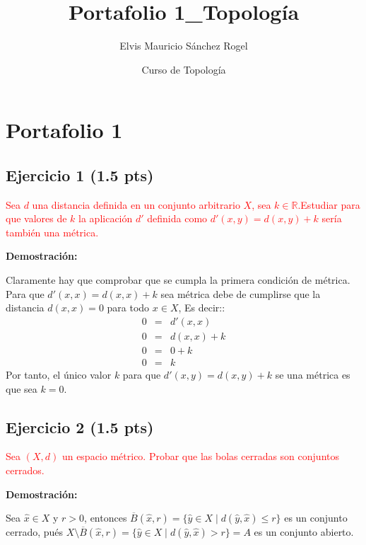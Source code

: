 \documentclass[
]{article}
\title{Portafolio 1\_Topología}
\author{Elvis Mauricio Sánchez Rogel}
\date{Curso de Topología}
\begin{document}
\maketitle

{
\hypersetup{linkcolor=blue}
\setcounter{tocdepth}{2}
\tableofcontents
}
\hypertarget{portafolio-1}{%
\section{Portafolio 1}\label{portafolio-1}}

\hypertarget{ejercicio-1-1.5-pts}{%
\subsection{Ejercicio 1 (1.5 pts)}\label{ejercicio-1-1.5-pts}}

\textcolor{red}{Sea $d$ una distancia definida en un conjunto arbitrario $X$, sea $k \in \mathbb{R}$.Estudiar para que valores de $k$ la aplicación $d'$ definida como $d'(x,y)=d(x,y)+k$ sería también una métrica.}

\textbf{Demostración:}

Claramente hay que comprobar que se cumpla la primera condición de
métrica. Para que \(d'(x,x)=d(x,x)+k\) sea métrica debe de cumplirse que
la distancia \(d(x,x)=0\) para todo \(x \in X\), Es decir::
\begin{eqnarray*}
  0 & = & d'(x,x) \\
  0 & = & d(x,x)+k  \\
  0 & = & 0 + k \\
  0 & = & k 
\end{eqnarray*} Por tanto, el único valor \(k\) para que
\(d'(x,y) =d(x,y)+k\) se una métrica es que sea \(k=0\).

\hypertarget{ejercicio-2-1.5-pts}{%
\subsection{Ejercicio 2 (1.5 pts)}\label{ejercicio-2-1.5-pts}}

\textcolor{red}{ Sea $(X,d)$ un espacio métrico. Probar que las bolas cerradas son conjuntos cerrados.}

\textbf{Demostración:}

Sea \(\hat{x} \in X\) y \(r>0\), entonces
\(\overline{B}(\hat{x},r)=\{ \hat{y} \in X \mid d(\hat{y},\hat{x}) \leq r\}\)
es un conjunto cerrado, pués
\(X \setminus \overline B(\hat{x},r) = \{ \hat{y} \in X \mid d(\hat{y},\hat{x}) > r\}= A\)
es un conjunto abierto.
\end{document}
